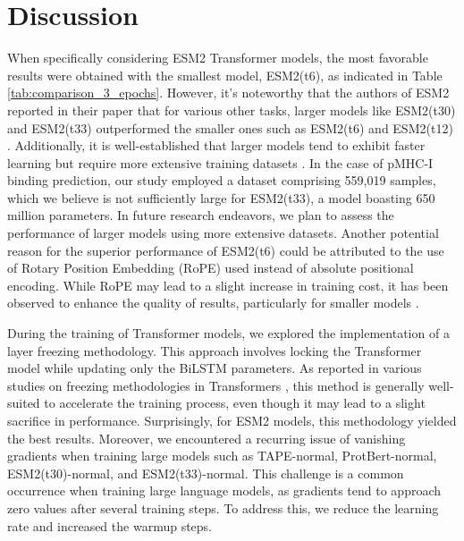 \section{Discussion}

When specifically considering ESM2 Transformer models, the most favorable results were obtained with the smallest model, ESM2(t6), as indicated in Table \ref{tab:comparison_3_epochs}. However, it's noteworthy that the authors of ESM2 reported in their paper that for various other tasks, larger models like ESM2(t30) and ESM2(t33) outperformed the smaller ones such as ESM2(t6) and ESM2(t12) \cite{lin2023evolutionary}. Additionally, it is well-established that larger models tend to exhibit faster learning but require more extensive training datasets \cite{elnaggar2021prottrans}. In the case of pMHC-I binding prediction, our study employed a dataset comprising 559,019 samples, which we believe is not sufficiently large for ESM2(t33), a model boasting 650 million parameters. In future research endeavors, we plan to assess the performance of larger models using more extensive datasets. Another potential reason for the superior performance of ESM2(t6) could be attributed to the use of Rotary Position Embedding (RoPE) used instead of absolute positional encoding. While RoPE may lead to a slight increase in training cost, it has been observed to enhance the quality of results, particularly for smaller models \cite{lin2023evolutionary}.



During the training of Transformer models, we explored the implementation of a layer freezing methodology. This approach involves locking the Transformer model while updating only the BiLSTM parameters. As reported in various studies on freezing methodologies in Transformers \cite{merchant2020happens,lee2019would,kovaleva2019revealing}, this method is generally well-suited to accelerate the training process, even though it may lead to a slight sacrifice in performance. Surprisingly, for ESM2 models, this methodology yielded the best results. Moreover, we encountered a recurring issue of vanishing gradients when training large models such as TAPE-normal, ProtBert-normal, ESM2(t30)-normal, and ESM2(t33)-normal. This challenge is a common occurrence when training large language models, as gradients tend to approach zero values after several training steps. To address this, we reduce the learning rate and increased the warmup steps.


